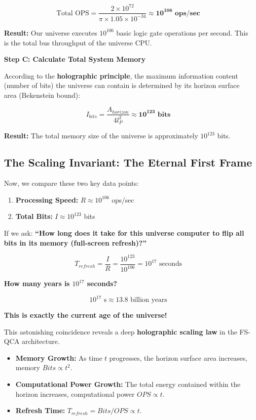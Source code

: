 $$\text{Total OPS} = \frac{2 \times 10^{72}}{\pi \times 1.05 \times 10^{-34}} \approx \mathbf{10^{106} \text{ ops/sec}}$$

\textbf{Result:} Our universe executes \textbf{$10^{106}$} basic logic gate operations per second. This is the total bus throughput of the universe CPU.

\textbf{Step C: Calculate Total System Memory}

According to the \textbf{holographic principle}, the maximum information content (number of bits) the universe can contain is determined by its horizon surface area (Bekenstein bound):

$$I_{bits} = \frac{A_{horizon}}{4 l_P^2} \approx \mathbf{10^{123} \text{ bits}}$$

\textbf{Result:} The total memory size of the universe is approximately \textbf{$10^{123}$} bits.

\subsection{The Scaling Invariant: The Eternal First Frame}

Now, we compare these two key data points:

\begin{enumerate}
\item \textbf{Processing Speed:} $R \approx 10^{106}$ ops/sec

\item \textbf{Total Bits:} $I \approx 10^{123}$ bits
\end{enumerate}

If we ask: \textbf{``How long does it take for this universe computer to flip all bits in its memory (full-screen refresh)?''}

$$T_{refresh} = \frac{I}{R} = \frac{10^{123}}{10^{106}} = 10^{17} \text{ seconds}$$

\textbf{How many years is $10^{17}$ seconds?}

$$10^{17} \text{ s} \approx 13.8 \text{ billion years}$$

\textbf{This is exactly the current age of the universe!}

This astonishing coincidence reveals a deep \textbf{holographic scaling law} in the FS-QCA architecture.

\begin{itemize}
\item \textbf{Memory Growth:} As time $t$ progresses, the horizon surface area increases, memory $Bits \propto t^2$.

\item \textbf{Computational Power Growth:} The total energy contained within the horizon increases, computational power $OPS \propto t$.

\item \textbf{Refresh Time:} $T_{refresh} = Bits / OPS \propto t$.
\end{itemize}

